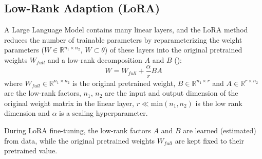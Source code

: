\documentclass{article}
\newcommand{\R}{\mathbb{R}}
\begin{document}
\subsection{Low-Rank Adaption (LoRA)}
A Large Language Model contains many linear layers, and the LoRA method reduces the number of trainable parameters by reparameterizing the weight parameters ($W \in \R^{n_1 \times n_2}$, $W \subset \theta$) of these layers into the original pretrained weights $W_{full}$ and a low-rank decomposition $A$ and $B$ (\cite{hayou_lora_2024}):
\begin{equation} \label{eq:LoRA}
    W = W_{full} + \frac{\alpha}{r} BA 
\end{equation}
%
where 
$W_{full} \in \R^{n_1 \times n_2}$ is the original pretrained weight, 
$B \in \R^{n_1 \times r}$ and $A \in \R^{r \times n_2}$ are the low-rank factors, 
$n_1$, $n_2$ are the input and output dimension of the original weight matrix in the linear layer,
$r \ll \text{min}(n_1, n_2)$ is the low rank dimension 
and $\alpha$ is a scaling hyperparameter.

During LoRA fine-tuning, the low-rank factors $A$ and $B$ are learned (estimated) from data, while the original pretrained weights $W_{full}$ are kept fixed to their pretrained value.
\end{document}
